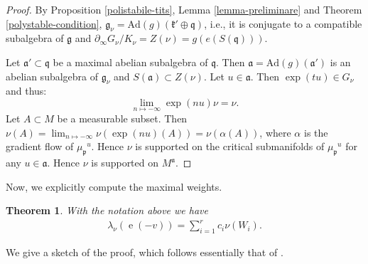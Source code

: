 \documentclass[leqno,11pt, a4]{amsart}
\newtheorem{teo}[equation]{Theorem}
\theoremstyle{named}
\begin{document}
\begin{proof}
By Proposition \ref{polistabile-tits}, Lemma \ref{lemma-preliminare} and Theorem \ref{polystable-condition}, ${\mathfrak{g}}_\nu=\mathrm{Ad}(g)({\mathfrak{k}}' \oplus {\mathfrak{q}})$, i.e., it is conjugate to a compatible subalgebra of ${\mathfrak{g}}$ and $\partial_\infty G_\nu /K_\nu=Z(\nu)=g(e(S({\mathfrak{q}})))$.

Let ${\mathfrak{a}}'\subset {\mathfrak{q}}$ be a maximal abelian subalgebra of ${\mathfrak{q}}$. Then ${\mathfrak{a}}=\mathrm{Ad}(g)({\mathfrak{a}}')$ is an abelian subalgebra of ${\mathfrak{g}}_\nu$ and $S({\mathfrak{a}})\subset Z(\nu)$.
Let $u\in {\mathfrak{a}}$. Then $\exp(tu) \in G_\nu$ and thus:
\[
\lim_{n\mapsto -\infty} \exp(n u)\nu =\nu.
\]
Let $A\subset M$ be a measurable subset. Then $\nu(A)=\lim_{n\mapsto -\infty} \nu(\exp (n u) (A))=\nu(\alpha (A))$, where $\alpha$ is the gradient flow of ${\mu_{\mathfrak{p}}}^{u}$.
Hence $\nu$ is supported on the critical submanifolds of ${\mu_{\mathfrak{p}}}^{u}$ for any $u \in {\mathfrak{a}}$. Hence $\nu$ is supported on $M^{\mathfrak{a}}$.
\end{proof}
Now, we explicitly compute the maximal weights.
\begin{teo} \label{calcolo-lambda} With the notation above we have
  \begin{gather*}
    {\lambda}_\nu({\operatorname{e}}(-v)) = \sum_{i=1}^r c_i \nu(W_i).
  \end{gather*}
\end{teo}
We give a sketch of the proof, which follows essentially that of \cite[Th. 5.23]{bgs}.
\end{document}
